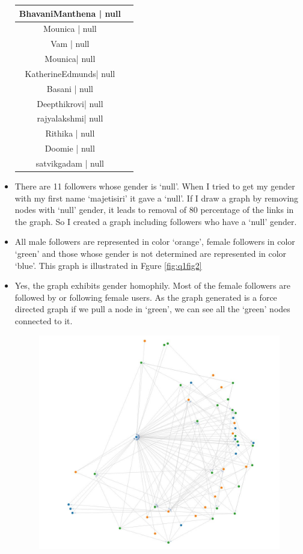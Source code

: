 \begin{itemize}
\begin{table}
\begin{center}
\begin{tabular}{| c | c |}
BhavaniManthena	|	null\\ \hline		
Mounica		|		null\\ \hline		
Vam				|	null\\ \hline		
Mounica|			null\\ \hline		
KatherineEdmunds|	null\\ \hline
Basani			|	null\\ \hline	
Deepthikrovi| 		null\\ \hline
rajyalakshmi| 		null\\ \hline
Rithika		|		null\\ \hline	
Doomie		|		null\\ \hline
satvikgadam   |  	null\\ \hline	
                
\end{tabular}
\end{center}
\end{table}
\item There are 11 followers whose gender is `null'. When I tried to get my gender with my first name `majetisiri' it gave a `null'. If I draw a graph by removing nodes with `null' gender, it leads to removal of 80 percentage of the links in the graph. So I created a graph including followers who have a `null' gender.
\item All male followers are represented in color `orange', female followers in color `green' and those whose gender is not determined are represented in color `blue'. This graph is illustrated in Fgure \ref{fig:q1fig2}
\newpage
\item Yes, the graph exhibits gender homophily. Most of the female followers are followed by or following female users. As the graph generated is a force directed graph if we pull a node in `green', we can see all the `green' nodes connected to it.
\begin{figure}[h!]
\begin{center}
\includegraphics[scale=0.55, keepaspectratio=true]{figures/5.JPG}

\end{center}
\end{figure}
\end{itemize}
